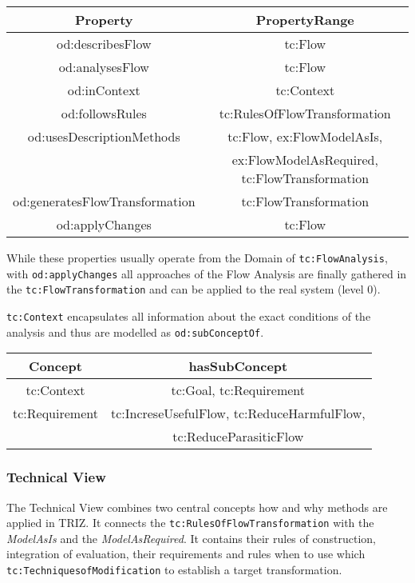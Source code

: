 \documentclass[a4paper,11pt]{article}
\begin{document}
\begin{itemize}
    \begin{center}
        \begin{tabular}{|c|c|}\hline
            Property & PropertyRange \\\hline
            od:describesFlow & tc:Flow \\
            od:analysesFlow & tc:Flow \\
            od:inContext & tc:Context \\
            od:followsRules & tc:RulesOfFlowTransformation \\
            od:usesDescriptionMethods & tc:Flow, ex:FlowModelAsIs, \\
            & ex:FlowModelAsRequired, tc:FlowTransformation \\
            od:generatesFlowTransformation & tc:FlowTransformation \\
            od:applyChanges & tc:Flow \\\hline 
        \end{tabular}
        \end{center}
    
    While these properties usually operate from the Domain of 
    \texttt{tc:FlowAnalysis}, with \newline
    \texttt{od:applyChanges} all approaches of the Flow Analysis are finally
    gathered in the \newline \texttt{tc:FlowTransformation} and can be applied 
    to the real system (level 0).

    \texttt{tc:Context} encapsulates all information about the exact conditions
    of the analysis and \newline thus are modelled as \texttt{od:subConceptOf}.

    \begin{center}
        \begin{tabular}{|c|c|}\hline
            Concept & hasSubConcept \\\hline
            tc:Context & tc:Goal, tc:Requirement \\
            tc:Requirement & tc:IncreseUsefulFlow, tc:ReduceHarmfulFlow, \\
            & tc:ReduceParasiticFlow \\\hline 
        \end{tabular}
        \end{center}

    \subsubsection{Technical View}
    The Technical View combines two central concepts how and why methods are applied
    in TRIZ. It connects the \texttt{tc:RulesOfFlowTransformation} with the 
    \emph{ModelAsIs} and the \emph{ModelAsRequired}. It contains their rules of 
    construction, integration of evaluation, their requirements and rules when to use
    which \texttt{tc:TechniquesofModification} to establish a target transformation. 


\end{itemize}
\end{document}
